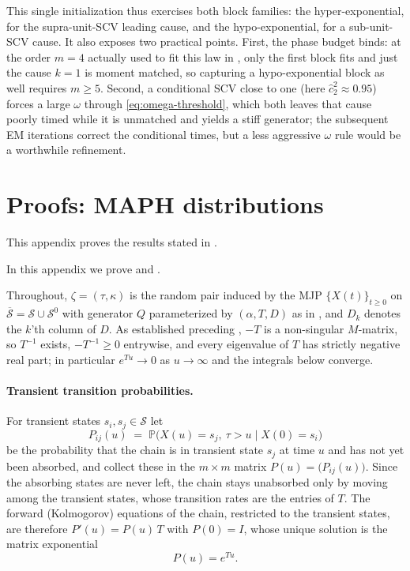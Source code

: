 \documentclass{article}
\newcommand{\Prob}{\mathbb{P}}
\newcommand{\cs}{\mathcal{S}}
\newcommand{\aachg}[1]{#1}
\newcommand{\subchg}[1]{#1}
\begin{document}
This single initialization thus exercises both block families: the hyper-exponential, for the supra-unit-SCV \subchg{leading} cause, and the hypo-exponential, for a sub-unit-SCV cause. It also exposes two practical points. First, the phase budget binds: at the order $m=4$ actually used to fit this law in , only \subchg{the first} block fits and just the cause $k=1$ is moment matched, so capturing a hypo-exponential block as well requires $m\ge5$. Second, a conditional SCV close to one (here $\hat c^2_2\approx0.95$) forces a large $\omega$ through \eqref{eq:omega-threshold}, which both leaves that cause poorly timed while it is unmatched and yields a stiff generator; the subsequent EM iterations correct the conditional times, but a less aggressive $\omega$ rule would be a worthwhile refinement.

\section{Proofs: MAPH distributions}
\label{app:proofs-maph}
\label{app:proof-maph-props}

This appendix proves the results stated in .

In this appendix we prove  \aachg{and }.

Throughout, $\zeta=(\tau,\kappa)$ is the random pair induced by the MJP $\{X(t)\}_{t\ge0}$ on $\overline{\cs}=\cs\cup\cs^0$ with generator $Q$ parameterized by $(\alpha,T,D)$ as in , and $D_k$ denotes the $k$'th column of $D$. As established preceding , $-T$ is a non-singular $M$-matrix, so $T^{-1}$ exists, $-T^{-1}\ge0$ entrywise, and every eigenvalue of $T$ has strictly negative real part; in particular $e^{Tu}\to 0$ as $u\to\infty$ and the integrals below converge.

\paragraph{Transient transition probabilities.}
For transient states $s_i,s_j\in\cs$ let
\[
P_{ij}(u) \;=\; \Prob\big(X(u)=s_j,\ \tau>u \;\big|\; X(0)=s_i\big)
\]
be the probability that the chain is in transient state $s_j$ at time $u$ and has not yet been absorbed, and collect these in the $m\times m$ matrix $P(u)=\big(P_{ij}(u)\big)$. Since the absorbing states are never left, the chain stays unabsorbed only by moving among the transient states, whose transition rates are the entries of $T$. The forward (Kolmogorov) equations of the chain, restricted to the transient states, are therefore $P'(u)=P(u)\,T$ with $P(0)=I$, whose unique solution is the matrix exponential
\begin{equation}\label{eq:transient-prob}
P(u)=e^{Tu}.
\end{equation}
\end{document}
